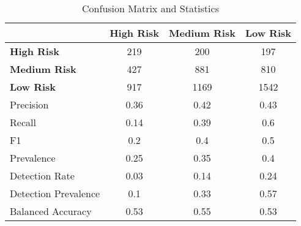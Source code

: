 \begin{table}[!htbp]
    \small
    \centering
    \caption{Confusion Matrix and Statistics}
    \label{tab:confusion}
    \begin{tabular}{lccc}
        \toprule
        & \textbf{High Risk} & \textbf{Medium Risk} & \textbf{Low Risk} \\
        \midrule
        \textbf{High Risk} & 219 & 200 & 197 \\
        \textbf{Medium Risk} & 427 & 881 & 810 \\
        \textbf{Low Risk} & 917 & 1169 & 1542 \\
        \bottomrule
        \midrule
        Precision & 0.36 & 0.42 & 0.43 \\
        Recall & 0.14 & 0.39 & 0.6 \\
        F1 & 0.2 & 0.4 & 0.5 \\
        Prevalence & 0.25 & 0.35 & 0.4 \\
        Detection Rate & 0.03 & 0.14 & 0.24 \\
        Detection Prevalence & 0.1 & 0.33 & 0.57 \\
        Balanced Accuracy & 0.53 & 0.55 & 0.53 \\
        \bottomrule
    \end{tabular}
\end{table}